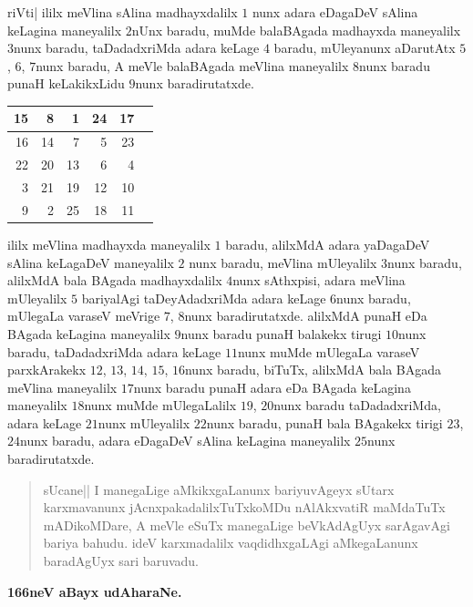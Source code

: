 riVti| ililx meVlina sAlina madhayxdalilx $1$ nunx adara eDagaDeV
sAlina keLagina maneyalilx $2$nUnx baradu, muMde balaBAgada madhayxda
maneyalilx $3$nunx baradu, taDadadxriMda adara keLage $4$ baradu,
mUleyanunx aDarutAtx $5$, $6$, $7$nunx baradu, A meVle balaBAgada
meVlina maneyalilx $8$nunx baradu punaH keLakikxLidu $9$nunx
baradirutatxde. 

\begin{center}
\renewcommand{\arraystretch}{1.2}
\begin{tabular}{|>{\rm}r|>{\rm}r|>{\rm}r|>{\rm}r|>{\rm}r|>{\rm}r|}
\hline
15 & 8 & 1 & 24 & 17\\
\hline
16 & 14 & 7 & 5 & 23\\
\hline
22 & 20 & 13 & 6 & 4\\
\hline
3 & 21 & 19 & 12 & 10\\
\hline
9 & 2 & 25 & 18 & 11\\
\hline
\end{tabular}
\end{center}

ililx meVlina madhayxda maneyalilx $1$ baradu, alilxMdA adara
yaDagaDeV sAlina keLagaDeV maneyalilx $2$ nunx baradu, meVlina
mUleyalilx $3$nunx baradu, alilxMdA bala BAgada madhayxdalilx $4$nunx
sAthxpisi, adara meVlina mUleyalilx $5$ bariyalAgi taDeyAdadxriMda
adara keLage $6$nunx baradu, mUlegaLa varaseV meVrige $7$, $8$nunx
baradirutatxde. alilxMdA punaH eDa BAgada keLagina maneyalilx $9$nunx
baradu punaH balakekx tirugi $10$nunx baradu, taDadadxriMda adara
keLage $11$nunx muMde mUlegaLa varaseV parxkArakekx $12$, $13$, $14$,
$15$, $16$nunx baradu, biTuTx, alilxMdA bala BAgada meVlina maneyalilx
$17$nunx baradu punaH adara eDa BAgada keLagina maneyalilx $18$nunx
muMde mUlegaLalilx $19$, $20$nunx baradu taDadadxriMda, adara keLage
$21$nunx mUleyalilx $22$nunx baradu, punaH bala BAgakekx tirigi $23$,
$24$nunx baradu, adara eDagaDeV sAlina keLagina maneyalilx $25$nunx
baradirutatxde. 

\begin{verse}
sUcane|| I manegaLige aMkikxgaLanunx bariyuvAgeyx sUtarx karxmavanunx
jAcnxpakadalilxTuTxkoMDu nAlAkxvatiR maMdaTuTx mADikoMDare, A meVle
eSuTx manegaLige beVkAdAgUyx sarAgavAgi bariya bahudu. ideV
karxmadalilx vaqdidhxgaLAgi aMkegaLanunx baradAgUyx sari baruvadu. 
\end{verse}

\medskip
\begin{center}
{\large\bf 166neV aBayx udAharaNe.}
\end{center}

